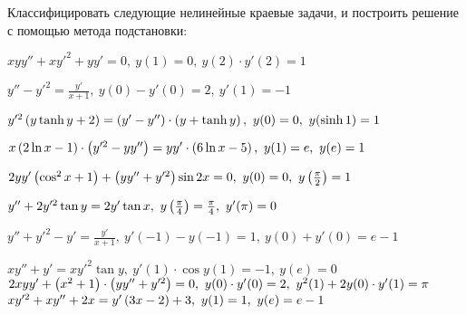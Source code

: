 	Классифицировать следующие нелинейные краевые задачи, и построить решение с помощью метода подстановки:
	\begin{enumtasks}

		\label{bvp_bvp:nonlinear}
		\item \( xyy'' + xy'^2 + yy' = 0, ~ y(1) = 0, ~ y(2) \cdot y'(2) = 1 \) %
		\item \( y'' - y'^2 = \frac{y'}{x + 1}, ~ y(0) - y'(0) = 2, ~ y'(1) = -1 \) %
		\item \( y'^2 \left( y \tanh{y} + 2 \right) = \left( y' - y'' \right) \cdot \left( y + \tanh{y} \right), ~ y(0) = 0, ~ y(\sinh{1}) = 1 \) %
		\item \( x \left( 2 \ln{x} - 1 \right) \cdot \left( y'^2 - yy'' \right) = yy' \cdot \left( 6 \ln{x} - 5 \right), ~ y(1) = e, ~ y(e) = 1 \) %
		\item \( 2yy' \left( \cos^2{x} + 1 \right) + \left( yy'' + y'^2 \right) \sin{2x} = 0, ~ y(0) = 0, ~ y \left( \frac{\pi}{2} \right) = 1 \) %
		\item \( y'' + 2y'^2 \tan{y} = 2y' \tan{x}, ~ y\left( \frac{\pi}{4} \right) = \frac{\pi}{4}, ~ y'(\pi) = 0 \) %
		
		\label{bvp_bvp:nonlinear_hard}
		\item \( y'' + y'^2 - y' = \frac{y'}{x + 1}, ~ y'(-1) - y(-1) = 1, ~ y(0) + y'(0) = e - 1 \) %
		\item \( xy'' + y' = xy'^2 \tan{y}, ~ y'(1) \cdot \cos{y(1)} = -1, ~ y(e) = 0 \) %
		\itemstar \( 2xyy' + \left( x^2 + 1 \right) \cdot \left( yy'' + y'^2 \right) = 0, ~ y(0) \cdot y'(0) = 2, ~ y^2(1) + 2y(0) \cdot y'(1) = \pi \) %
		\itemdstar \( xy'^2 + xy'' + 2x = y' \left( 3x - 2 \right) + 3, ~ y(1) = 1, ~ y(e) = e - 1 \) %

	\end{enumtasks}

